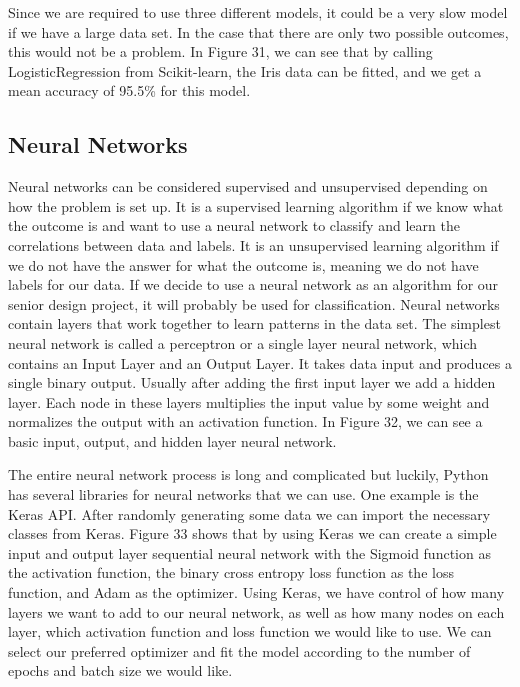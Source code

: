 \documentclass[a4paper,12pt]{report}
\begin{document}
Since we are required to use three different models, it could be a very slow model if we have a large data set. In the case that there are only two possible outcomes, this would not be a problem. In Figure 31, we can see that by calling LogisticRegression from Scikit-learn, the Iris data can be fitted, and we get a mean accuracy of 95.5\% for this model. 

\subsection{Neural Networks}

Neural networks can be considered supervised and unsupervised depending on how the problem is set up. It is a supervised learning algorithm if we know what the outcome is and want to use a neural network to classify and learn the correlations between data and labels. It is an unsupervised learning algorithm if we do not have the answer for what the outcome is, meaning we do not have labels for our data. If we decide to use a neural network as an algorithm for our senior design project, it will probably be used for classification. Neural networks contain layers that work together to learn patterns in the data set. The simplest neural network is called a perceptron or a single layer neural network, which contains an Input Layer and an Output Layer. It takes data input and produces a single binary output. Usually after adding the first input layer we add a hidden layer. Each node in these layers multiplies the input value by some weight and normalizes the output with an activation function. In Figure 32, we can see a basic input, output, and hidden layer neural network. 

The entire neural network process is long and complicated but luckily, Python has several libraries for neural networks that we can use. One example is the Keras API. After randomly generating some data we can import the necessary classes from Keras. Figure 33 shows that by using Keras we can create a simple input and output layer sequential neural network with the Sigmoid function as the activation function, the binary cross entropy loss function as the loss function, and Adam as the optimizer. Using Keras, we have control of how many layers we want to add to our neural network, as well as how many nodes on each layer, which activation function and loss function we would like to use. We can select our preferred optimizer and fit the model according to the number of epochs and batch size we would like. 
\end{document}
